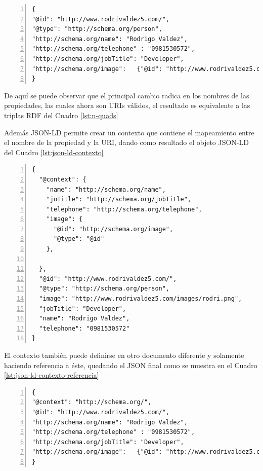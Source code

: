 \begin{lstlisting}[captionpos=b, caption=Ejemplo de un documento JSON-LD, label=lst:json-ld,  numbers=left,  numberstyle=\tiny\color{mygray},
    basicstyle=\tiny,frame=single]
{
"@id": "http://www.rodrivaldez5.com/",
"@type": "http://schema.org/person",
"http://schema.org/name": "Rodrigo Valdez",
"http://schema.org/telephone" : "0981530572",
"http://schema.org/jobTitle": "Developer",
"http://schema.org/image":   {"@id": "http://www.rodrivaldez5.com/images/rodri.png"} 
}
\end{lstlisting}

De aquí se puede observar que el principal cambio radica en los nombres de las propiedades, las cuales ahora son URIs válidos, el resultado es equivalente a las triplas RDF del Cuadro \ref{lst:n-quads}

Además JSON-LD permite crear un contexto que contiene el mapeamiento entre el nombre de la propiedad y la URI, dando como resultado el objeto JSON-LD del Cuadro \ref{lst:json-ld-contexto}

\begin{lstlisting}[captionpos=b, caption=Ejemplo de un documento JSON-LD con Contexto, label=lst:json-ld-contexto,  numbers=left,  numberstyle=\tiny\color{mygray},
    basicstyle=\tiny,frame=single]
{
  "@context": {
    "name": "http://schema.org/name",  
    "joTitle": "http://schema.org/jobTitle",  
    "telephone": "http://schema.org/telephone",  
    "image": {
      "@id": "http://schema.org/image",  
      "@type": "@id"  
    },
  
  },
  "@id": "http://www.rodrivaldez5.com/",
  "@type": "http://schema.org/person",
  "image": "http://www.rodrivaldez5.com/images/rodri.png",
  "jobTitle": "Developer",
  "name": "Rodrigo Valdez",
  "telephone": "0981530572"
}
\end{lstlisting}

El contexto también puede definirse en otro documento diferente y solamente haciendo referencia a éste, quedando el JSON final como se muestra en el Cuadro \ref{lst:json-ld-contexto-referencia}

\begin{lstlisting}[captionpos=b, caption=Ejemplo de un documento JSON-LD con Contexto referenciado, label=lst:json-ld-contexto-referencia,  numbers=left,  numberstyle=\tiny\color{mygray},
    basicstyle=\tiny,frame=single]
{
"@context": "http://schema.org/",
"@id": "http://www.rodrivaldez5.com/",
"http://schema.org/name": "Rodrigo Valdez",
"http://schema.org/telephone" : "0981530572",
"http://schema.org/jobTitle": "Developer",
"http://schema.org/image":   {"@id": "http://www.rodrivaldez5.com/images/rodri.png"} 
}
\end{lstlisting}

